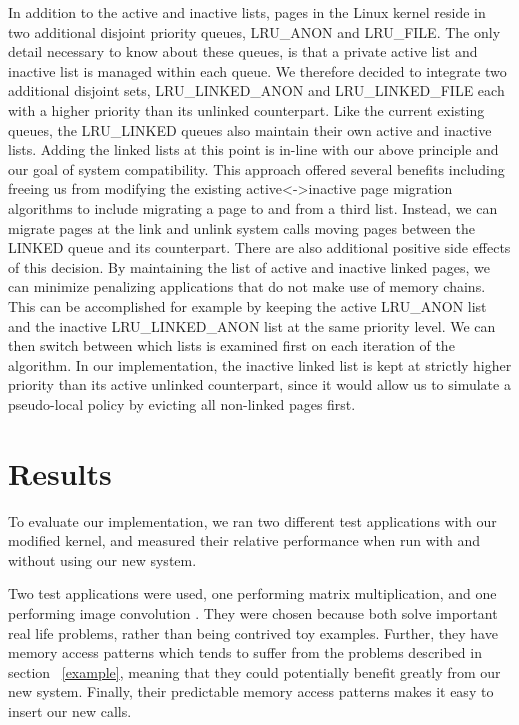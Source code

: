 \documentclass[10pt,a4paper,twocolumn]{article}
\begin{document}
In addition to the active and inactive lists, pages in the Linux kernel reside in two additional
disjoint priority queues, LRU\_ANON and LRU\_FILE.  The only detail necessary to know about these
queues, is that a private active list and inactive list is managed within each queue. We therefore
decided to integrate two additional disjoint sets, LRU\_LINKED\_ANON and LRU\_LINKED\_FILE each with
a higher priority than its unlinked counterpart. Like the current existing queues, the LRU\_LINKED
queues also maintain their own active and inactive lists. Adding the linked lists at this point is
in-line with our above principle and our goal of system compatibility. This approach offered several
benefits including freeing us from modifying the existing active<->inactive page migration
algorithms to include migrating a page to and from a third list. Instead, we can migrate pages at
the link and unlink system calls moving pages between the LINKED queue and its counterpart. There
are also additional positive side effects of this decision. By maintaining the list of active and
inactive linked pages, we can minimize penalizing applications that do not make use of memory
chains. This can be accomplished for example by keeping the active LRU\_ANON list and the inactive
LRU\_LINKED\_ANON list at the same priority level. We can then switch between which lists is
examined first on each iteration of the algorithm. In our implementation, the inactive linked list
is kept at strictly higher priority than its active unlinked counterpart, since it would allow us to
simulate a pseudo-local policy by evicting all non-linked pages first.

\section{Results}
To evaluate our implementation, we ran two different test applications with our modified kernel, and
measured their relative performance when run with and without using our new system.

Two test applications were used, one performing matrix multiplication, and one performing image
convolution \cite{GONZALES}. They were chosen
because  both solve important real life problems, rather than being contrived toy examples. Further,
they have memory access patterns which tends to suffer from the problems described in section
~\ref{example}, meaning that they could potentially benefit greatly from our new system. Finally,
their predictable memory access patterns makes it easy to insert our new calls.
\end{document}
